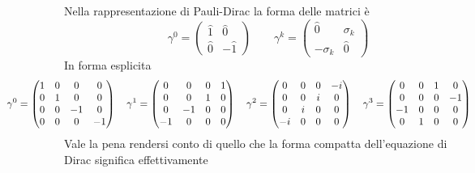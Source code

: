 Nella rappresentazione di Pauli-Dirac la forma delle matrici è
$$
\gamma^0 = \begin{pmatrix} \hat{1} & \hat{0} \\ \hat{0} & -\hat{1} \end{pmatrix} \qquad \gamma^k = \begin{pmatrix} \hat{0} & \sigma_k \\ -\sigma_k & \hat{0} \end{pmatrix}
$$
In forma esplicita
$$\hspace*{-2cm}
\gamma^0 = \begin{pmatrix} 1 & 0 & 0 & 0 \\ 0 & 1 & 0 & 0 \\ 0 & 0 & -1 & 0 \\ 0 & 0 & 0 & -1 \end{pmatrix} \quad \gamma^1 = \begin{pmatrix} 0 & 0 & 0 & 1 \\ 0 & 0 & 1 & 0 \\ 0 & -1 & 0 & 0 \\ -1 & 0 & 0 & 0 \end{pmatrix} \quad \gamma^2 = \begin{pmatrix} 0 & 0 & 0 & -i \\ 0 & 0 & i & 0 \\ 0 & i & 0 & 0 \\ -i & 0 & 0 & 0 \end{pmatrix} \quad \gamma^3 = \begin{pmatrix} 0 & 0 & 1 & 0 \\ 0 & 0 & 0 & -1 \\ -1 & 0 & 0 & 0 \\ 0 & 1 & 0 & 0 \end{pmatrix}
$$
Vale la pena rendersi conto di quello che la forma compatta dell'equazione di Dirac significa effettivamente
